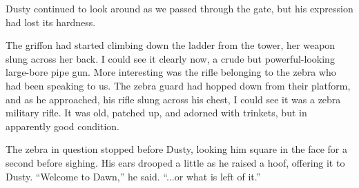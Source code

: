 Dusty continued to look around as we passed through the gate, but his expression had lost its hardness.

The griffon had started climbing down the ladder from the tower, her weapon slung across her back. I could see it clearly now, a crude but powerful-looking large-bore pipe gun. More interesting was the rifle belonging to the zebra who had been speaking to us. The zebra guard had hopped down from their platform, and as he approached, his rifle slung across his chest, I could see it was a zebra military rifle. It was old, patched up, and adorned with trinkets, but in apparently good condition.

The zebra in question stopped before Dusty, looking him square in the face for a second before sighing. His ears drooped a little as he raised a hoof, offering it to Dusty. “Welcome to Dawn,” he said. “...or what is left of it.”